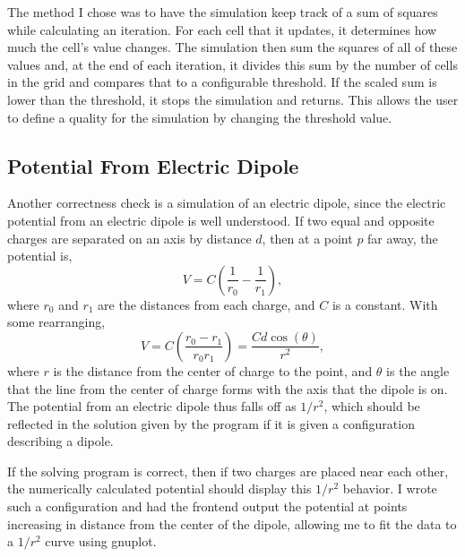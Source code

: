 The method I chose was to have the simulation keep track of a sum of squares while calculating an iteration. For each cell
that it updates, it determines how much the cell's value changes. The simulation then sum the squares of all of these values
and, at the end of each iteration, it divides this sum by the number of cells in the grid and compares that to a configurable threshold.
If the scaled sum is lower than the threshold, it stops the simulation and returns. This allows the user to define a quality for
the simulation by changing the threshold value.









\subsection{Potential From Electric Dipole}
Another correctness check is a simulation of an electric dipole, since the electric potential from an electric dipole is well understood.
If two equal and opposite charges are separated on an axis by distance $d$, then at a point $p$ far away, the
potential is,
$$V = C\left(\frac{1}{r_0} - \frac{1}{r_1}\right),$$
where $r_0$ and $r_1$ are the distances from each charge, and $C$ is a constant. With some rearranging,
$$V = C\left(\frac{r_0 - r_1}{r_0 r_1}\right) = \frac{C d \cos(\theta)}{r^2},$$
where $r$ is the distance from the center of charge to the point, and $\theta$ is the angle that the line from the
center of charge forms with the axis that the dipole is on\cite{griffiths}. The potential from an electric dipole thus falls off as $1/r^2$,
which should be reflected in the solution given by the program if it is given a configuration describing a dipole.

If the solving program is correct, then if two charges are placed near each other, the numerically calculated potential
should display this $1/r^2$ behavior. I wrote such a configuration and had the frontend output the potential at points
increasing in distance from the center of the dipole, allowing me to fit the data to a $1/r^2$ curve using gnuplot\cite{gnuplot}.














